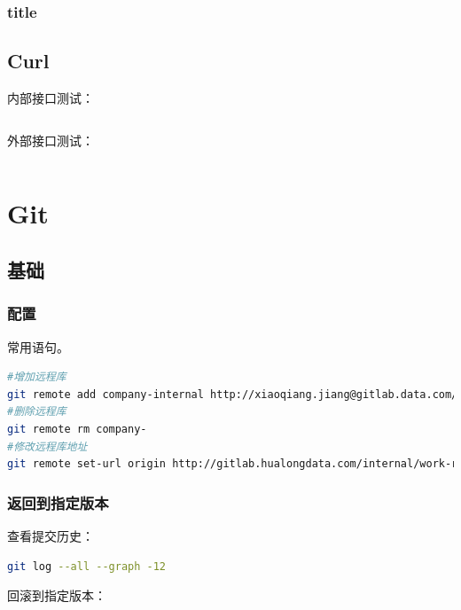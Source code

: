 \documentclass[letter]{book}
\begin{document}
\subsection{title}

\section{Curl}

内部接口测试：

\begin{lstlisting}[language=Bash]

\end{lstlisting}

外部接口测试：


\begin{lstlisting}[language=Bash]

\end{lstlisting}

\chapter{Git}

\section{基础}

\subsection{配置}

常用语句。

\begin{lstlisting}[language=Bash]
#增加远程库
git remote add company-internal http://xiaoqiang.jiang@gitlab.data.com/backend/system.git
#删除远程库
git remote rm company-
#修改远程库地址
git remote set-url origin http://gitlab.hualongdata.com/internal/work-record.git
\end{lstlisting}

\subsection{返回到指定版本}

查看提交历史：

\begin{lstlisting}[language=Bash]
git log --all --graph -12
\end{lstlisting}

回滚到指定版本：
\end{document}
